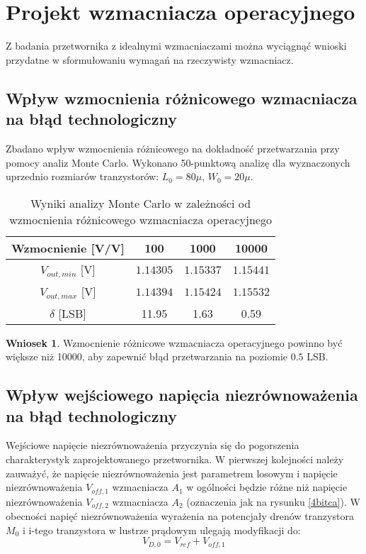 \documentclass[10pt,a4paper,twoside]{report}
\theoremstyle{definition}
\theoremstyle{definition}
\theoremstyle{definition}
\theoremstyle{definition}
\theoremstyle{definition}
\newtheorem{wniosek}{Wniosek}[section]
\begin{document}
{{{{{{	\section{Projekt wzmacniacza operacyjnego}
	{	Z badania przetwornika z idealnymi wzmacniaczami można wyciągnąć wnioski przydatne w sformułowaniu wymagań na rzeczywisty wzmacniacz. }
	\subsection{Wpływ wzmocnienia różnicowego wzmacniacza na błąd technologiczny}
	{	Zbadano wpływ wzmocnienia różnicowego na dokładność przetwarzania przy pomocy analiz Monte Carlo. Wykonano 50-punktową analizę dla wyznaczonych uprzednio rozmiarów tranzystorów: $L_0 = 80\mu$, $W_0 = 20\mu$.}
	\begin{table}[!ht]
	\begin{center}
		\begin{tabular}{|c|c|c|c|}
			\hline 
			Wzmocnienie [V/V] & 100 & 1000 & 10000 \\ 
			\hline 
			$V_{out,min}$ [V] & $1.14305$ & $1.15337$ & $1.15441$ \\ 
			\hline
			$V_{out,max}$ [V] & $1.14394$ & $1.15424$ & $1.15532$ \\ 
			\hline 
			$\delta$ [LSB]  & 11.95 & 1.63 & 0.59 \\
			\hline
		\end{tabular}
	\end{center}
	\caption{Wyniki analizy Monte Carlo w zależności od wzmocnienia różnicowego wzmacniacza operacyjnego}
	\end{table}
	\begin{wniosek}{Wzmocnienie różnicowe wzmacniacza operacyjnego powinno być większe niż 10000, aby zapewnić błąd przetwarzania na poziomie $0.5$ LSB.}
	\end{wniosek}

	\subsection{Wpływ wejściowego napięcia niezrównoważenia na błąd technologiczny}
	{	Wejściowe napięcie niezrównoważenia przyczynia się do pogorszenia charakterystyk zaprojektowanego przetwornika. W pierwszej kolejności należy zauważyć, że napięcie niezrównoważenia jest parametrem losowym i napięcie niezrównoważenia $V_{off,1}$ wzmacniacza $A_{1}$ w ogólności będzie różne niż napięcie niezrównoważenia $V_{off,2}$ wzmacniacza $A_{2}$ (oznaczenia jak na rysunku \ref{4bitca}). W obecności napięć niezrównoważenia wyrażenia na potencjały drenów tranzystora $M_0$ i i-tego tranzystora w lustrze prądowym ulegają modyfikacji do:
		\begin{equation}
			V_{D,0} = V_{ref} + V_{off,1}
		\end{equation}

}}}}}}}
\end{document}
